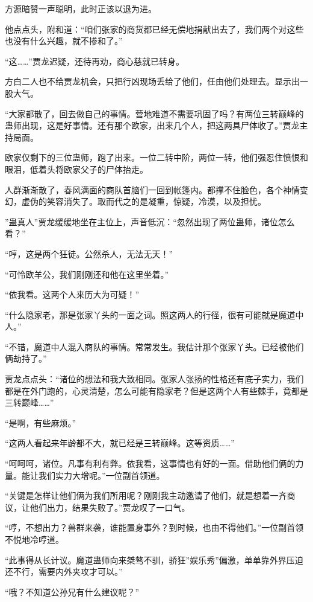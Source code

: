 \begin{this_body}
方源暗赞一声聪明，此时正该以退为进。

他点点头，附和道：“咱们张家的商货都已经无偿地捐献出去了，我们两个对这些也没有什么兴趣，就不掺和了。”

“这……”贾龙迟疑，还待再劝，商心慈就已转身。

方白二人也不给贾龙机会，只把行凶现场丢给了他们，任由他们处理去。显示出一股大气。

“大家都散了，回去做自己的事情。营地难道不需要巩固了吗？有两位三转巅峰的蛊师出现，这是好事情。还有那个欧家，出来几个人，把这两具尸体收了。”贾龙主持局面。

欧家仅剩下的三位蛊师，跑了出来。一位二转中阶，两位一转，他们强忍住愤恨和眼泪，低着头将欧家父子的尸体抬走。

人群渐渐散了，春风满面的商队首脑们一回到帐篷内。都撑不住脸色，各个神情变幻，虚伪的笑容消失了。取而代之的是凝重，惊疑，冷漠，以及担忧。

”蛊真人”贾龙缓缓地坐在主位上，声音低沉：“忽然出现了两位蛊师，诸位怎么看？”

“哼，这是两个狂徒。公然杀人，无法无天！”

“可怜欧羊公，我们刚刚还和他在这里坐着。”

“依我看。这两个人来历大为可疑！”

“什么隐家老，那是张家丫头的一面之词。照这两人的行径，很有可能就是魔道中人。”

“不错，魔道中人混入商队的事情。常常发生。我估计那个张家丫头。已经被他们俩劫持了。”

贾龙点点头：“诸位的想法和我大致相同。张家人张扬的性格还有底子实力，我们都是在外门跑的，心灵清楚，怎么可能有隐家老？但是这两个人有些棘手，竟都是三转巅峰……”

“是啊，有些麻烦。”

“这两人看起来年龄都不大，就已经是三转巅峰。这等资质……”

“呵呵呵，诸位。凡事有利有弊。依我看，这事情也有好的一面。借助他们俩的力量。能让我们实力大增呢。”一位副首领道。

“关键是怎样让他们俩为我们所用呢？刚刚我主动邀请了他们，就是想着一齐商议，让他们出力，结果失败了。”贾龙叹了一口气。

“哼，不想出力？兽群来袭，谁能置身事外？到时候，也由不得他们。”一位副首领不悦地冷哼道。

“此事得从长计议。魔道蛊师向来桀骜不驯，骄狂”娱乐秀”偏激，单单靠外界压迫还不行，需要内外夹攻才可以。”

“哦？不知道公孙兄有什么建议呢？”


\end{this_body}
